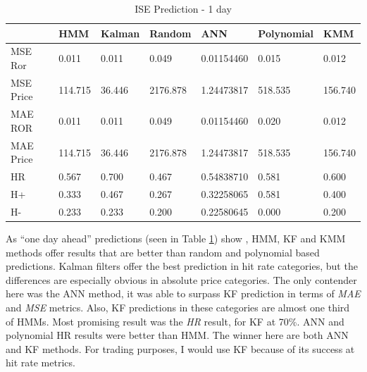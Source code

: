 \begin{table}[h]
\caption{\label{table1}ISE Prediction - 1 day}
\vspace{0.3cm}
\begin{tabular}{|l|l|l|l|l|l|l|}
\hline
 &                  HMM &       Kalman &   Random &        ANN &     Polynomial &    KMM\\
\hline
   MSE Ror &      0.011 &      0.011 &      0.049 & 0.01154460 &      0.015 &      0.012\\
\hline
 MSE Price &    114.715 &     36.446 &   2176.878 & 1.24473817 &    518.535 &    156.740\\
\hline
   MAE ROR &      0.011 &      0.011 &      0.049 & 0.01154460 &      0.020 &      0.012\\
\hline
 MAE Price &    114.715 &     36.446 &   2176.878 & 1.24473817 &    518.535 &    156.740\\
\hline
        HR &      0.567 &      0.700 &      0.467 & 0.54838710 &      0.581 &      0.600\\
\hline
        H+ &      0.333 &      0.467 &      0.267 & 0.32258065 &      0.581 &      0.400\\
\hline
        H- &      0.233 &      0.233 &      0.200 & 0.22580645 &      0.000 &      0.200\\
\hline
\end{tabular}
\end{table}

As ``one day ahead'' predictions (seen in Table \ref{table1}) show , HMM, KF and
KMM methods offer results that are better than random and polynomial based
predictions. Kalman filters offer the best prediction in hit rate categories,
but the differences are especially obvious in absolute price categories. The
only contender here was the ANN method, it was able to surpass KF prediction in
terms of {\em MAE} and {\em MSE} metrics. Also, KF predictions in these
categories are almost one third of HMMs. Most promising result was the {\em HR}
result, for KF at 70\%. ANN and polynomial {\rm HR} results were better than
HMM. The winner here are both ANN and KF methods. For trading purposes, I would
use KF because of its success at hit rate metrics.

